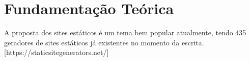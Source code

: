 \documentclass[ppginf, pep]{esinucpel}
\begin{document}
%
%
%
%
%

\chapter{Fundamentação Teórica}

A proposta dos sites estáticos é um tema bem popular atualmente, tendo 435 geradores de sites estáticos já existentes no momento da escrita. [https://staticsitegenerators.net/]
\end{document}
